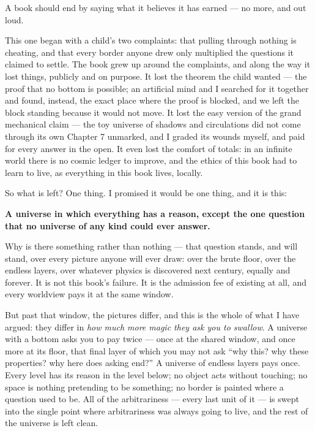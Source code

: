 \documentclass[fontsize=11pt,paper=a4,pagesize=auto,parskip=half-]{scrbook}
\begin{document}
\lettrine{A}{} book should end by saying what it believes it has earned --- no more, and out loud.

This one began with a child's two complaints: that pulling through nothing is cheating, and that every border anyone drew only multiplied the questions it claimed to settle. The book grew up around the complaints, and along the way it lost things, publicly and on purpose. It lost the theorem the child wanted --- the proof that no bottom is possible; an artificial mind and I searched for it together and found, instead, the exact place where the proof is blocked, and we left the block standing because it would not move. It lost the easy version of the grand mechanical claim --- the toy universe of shadows and circulations did not come through its own Chapter 7 unmarked, and I graded its wounds myself, and paid for every answer in the open. It even lost the comfort of totals: in an infinite world there is no cosmic ledger to improve, and the ethics of this book had to learn to live, as everything in this book lives, locally.

So what is left? One thing. I promised it would be one thing, and it is this:

\textbf{A universe in which everything has a reason, except the one question that no universe of any kind could ever answer.}

Why is there something rather than nothing --- that question stands, and will stand, over every picture anyone will ever draw: over the brute floor, over the endless layers, over whatever physics is discovered next century, equally and forever. It is not this book's failure. It is the admission fee of existing at all, and every worldview pays it at the same window.

But past that window, the pictures differ, and this is the whole of what I have argued: they differ in \emph{how much more magic they ask you to swallow}. A universe with a bottom asks you to pay twice --- once at the shared window, and once more at its floor, that final layer of which you may not ask ``why this? why these properties? why here does asking end?'' A universe of endless layers pays once. Every level has its reason in the level below; no object acts without touching; no space is nothing pretending to be something; no border is painted where a question used to be. All of the arbitrariness --- every last unit of it --- is swept into the single point where arbitrariness was always going to live, and the rest of the universe is left clean.
\end{document}

